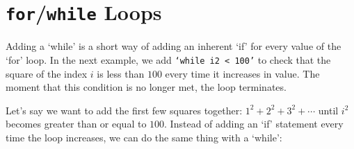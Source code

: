 \section{\texttt{for}/\texttt{while} Loops}


Adding a `while' is a short way of adding an inherent `if' for every value of the `for' loop. In the next example, we add \texttt{`while i2 < 100'} to check that the square of the index $i$ is less than $100$ every time it increases in value. The moment that this condition is no longer met, the loop terminates.

Let's say we want to add the first few squares together: $1^2+2^2+3^2+\cdots$ until $i^2$ becomes greater than or equal to $100$. Instead of adding an `if' statement every time the loop increases, we can do the same thing with a `while':

